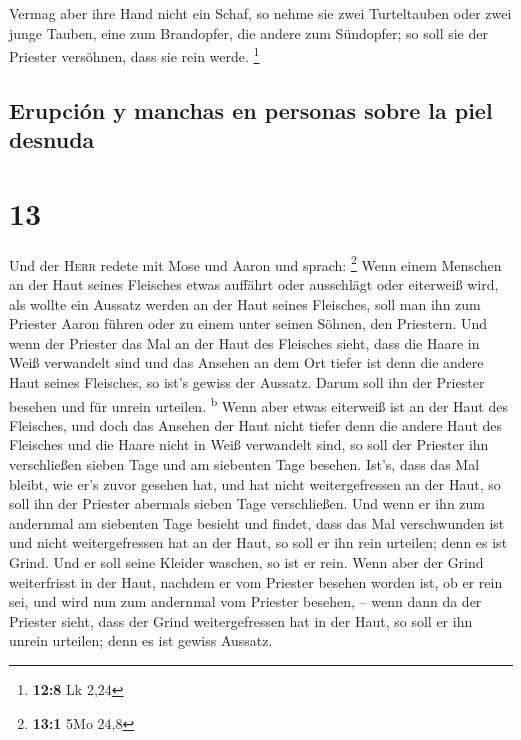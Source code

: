  Vermag aber ihre Hand nicht ein Schaf, so nehme sie zwei
Turteltauben oder zwei junge Tauben, eine zum Brandopfer, die andere zum
Sündopfer; so soll sie der Priester versöhnen, dass sie rein werde.
\footnote{\textbf{12:8} Lk 2,24}

\hypertarget{erupciuxf3n-y-manchas-en-personas-sobre-la-piel-desnuda}{%
\subsection{Erupción y manchas en personas sobre la piel
desnuda}\label{erupciuxf3n-y-manchas-en-personas-sobre-la-piel-desnuda}}

\hypertarget{section-12}{%
\section{13}\label{section-12}}

 Und der \textsc{Herr} redete mit Mose und Aaron und
sprach: \footnote{\textbf{13:1} 5Mo 24,8}  Wenn einem
Menschen an der Haut seines Fleisches etwas auffährt oder ausschlägt
oder eiterweiß wird, als wollte ein Aussatz werden an der Haut seines
Fleisches, soll man ihn zum Priester Aaron führen oder zu einem unter
seinen Söhnen, den Priestern.  Und wenn der Priester das
Mal an der Haut des Fleisches sieht, dass die Haare in Weiß verwandelt
sind und das Ansehen an dem Ort tiefer ist denn die andere Haut seines
Fleisches, so ist's gewiss der Aussatz. Darum soll ihn der Priester
besehen und für unrein urteilen. \textsuperscript{b}  Wenn
aber etwas eiterweiß ist an der Haut des Fleisches, und doch das Ansehen
der Haut nicht tiefer denn die andere Haut des Fleisches und die Haare
nicht in Weiß verwandelt sind, so soll der Priester ihn verschließen
sieben Tage  und am siebenten Tage besehen. Ist's, dass
das Mal bleibt, wie er's zuvor gesehen hat, und hat nicht
weitergefressen an der Haut,  so soll ihn der Priester
abermals sieben Tage verschließen. Und wenn er ihn zum andernmal am
siebenten Tage besieht und findet, dass das Mal verschwunden ist und
nicht weitergefressen hat an der Haut, so soll er ihn rein urteilen;
denn es ist Grind. Und er soll seine Kleider waschen, so ist er rein.
 Wenn aber der Grind weiterfrisst in der Haut, nachdem er
vom Priester besehen worden ist, ob er rein sei, und wird nun zum
andernmal vom Priester besehen, --  wenn dann da der
Priester sieht, dass der Grind weitergefressen hat in der Haut, so soll
er ihn unrein urteilen; denn es ist gewiss Aussatz.

